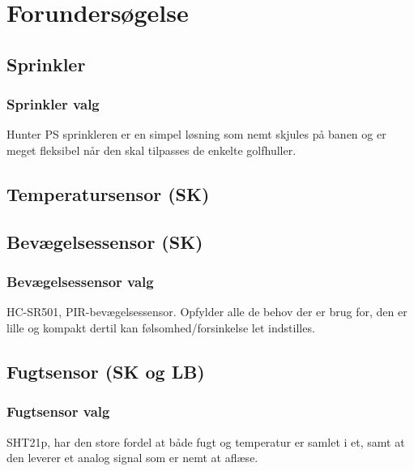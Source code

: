 \chapter{Forundersøgelse}

\section{Sprinkler}								%

\subsection{Sprinkler valg}						%
Hunter PS sprinkleren er en simpel løsning som nemt skjules på banen og er meget fleksibel når den skal tilpasses de enkelte golfhuller.

\newpage
\section{Temperatursensor (SK)}						


\section{Bevægelsessensor (SK)}						

\subsection{Bevægelsessensor valg}				%
HC-SR501, PIR-bevægelsessensor. Opfylder alle de behov der er brug for, den er lille og kompakt dertil kan følsomhed/forsinkelse let indstilles.

\newpage
\section{Fugtsensor (SK og LB)}						

\subsection{Fugtsensor valg}						%
SHT21p, har den store fordel at både fugt og temperatur er samlet i et, samt at den leverer et analog signal som er nemt at aflæse. 